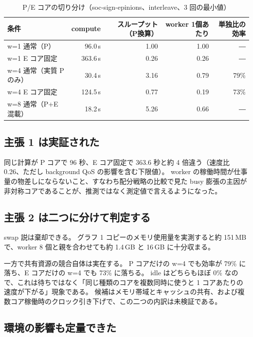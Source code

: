 \begin{table}[htbp]
  \centering
  \caption{P/E コアの切り分け（soc-sign-epinions、interleave、3 回の最小値）}
  \label{tab:pe-split}
  \begin{tabular}{lrrrr}
    \toprule
    条件 & compute & スループット（P換算） & worker 1個あたり & 単独比の効率 \\
    \midrule
    w=1 通常（P）           & 96.0\,s  & 1.00 & 1.00 & ― \\
    w=1 E コア固定          & 363.6\,s & 0.26 & 0.26 & ― \\
    w=4 通常（実質 P のみ）  & 30.4\,s  & 3.16 & 0.79 & 79\% \\
    w=4 E コア固定          & 124.5\,s & 0.77 & 0.19 & 73\% \\
    w=8 通常（P+E 混載）     & 18.2\,s  & 5.26 & 0.66 & ― \\
    \bottomrule
  \end{tabular}
\end{table}

\subsection{主張 1 は実証された}

同じ計算が P コアで 96 秒、E コア固定で 363.6 秒と約 4 倍違う（速度比 0.26、ただし background QoS の影響を含む下限値）。
worker の稼働時間が仕事量の物差しにならないこと、すなわち配分戦略の比較で見た busy 膨張の主因が非対称コアであることが、推測ではなく測定値で言えるようになった。

\subsection{主張 2 は二つに分けて判定する}

swap 説は棄却できる。
グラフ 1 コピーのメモリ使用量を実測すると約 151\,MB で、worker 8 個と親を合わせても約 1.4\,GB と 16\,GB に十分収まる。

一方で共有資源の競合自体は実在する。
P コアだけの w=4 でも効率が 79\% に落ち、E コアだけの w=4 でも 73\% に落ちる。
idle はどちらもほぼ 0\% なので、これは待ちではなく「同じ種類のコアを複数同時に使うと 1 コアあたりの速度が下がる」現象である。
候補はメモリ帯域とキャッシュの共有、および複数コア稼働時のクロック引き下げで、この二つの内訳は未検証である。

\subsection{環境の影響も定量できた}

